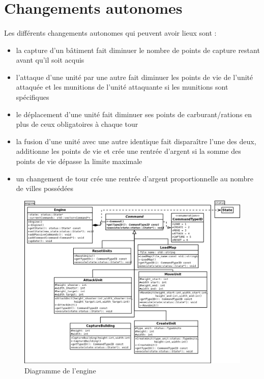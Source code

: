 \documentclass[12pt]{report}
\begin{document}
\section{Changements autonomes}
\paragraph{}Les différents changements autonomes qui peuvent avoir lieux sont :
\begin{itemize}
    \item la capture d'un bâtiment fait diminuer le nombre de points de capture restant avant qu'il soit acquis
    \item l'attaque d'une unité par une autre fait diminuer les points de vie de l'unité attaquée et les munitions de l'unité attaquante si les munitions sont spécifiques
    \item le déplacement d'une unité fait diminuer ses points de carburant/rations en plus de ceux obligatoires à chaque tour
    \item la fusion d'une unité avec une autre identique fait disparaître l'une des deux, additionne les points de vie et crée une rentrée d'argent si la somme des points de vie dépasse la limite maximale
    \item un changement de tour crée une rentrée d'argent proportionnelle au nombre de villes possédées
\end{itemize}

    \newpage
\thispagestyle{empty}
\begin{landscape}
\begin{figure}[h]
    \begin{center}
    \includegraphics[scale=0.6]{engine.png}
    \end{center}
    \caption{Diagramme de l'engine}
\end{figure}
\end{landscape}
\end{document}
